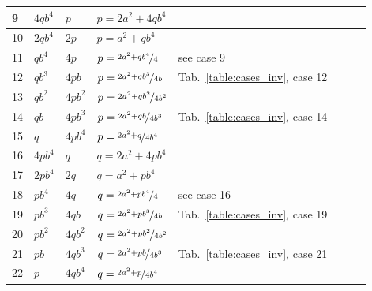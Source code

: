 \documentclass[12pt]{amsart}
\theoremstyle{definition}
\begin{document}
{\begin{table}[H]
\begin{tabular}{|l|l|l|l|l|l|l|l|}
				\\
				\hline
				9 &
				$4qb^4$ &
				$p$ &
				$p=2a^2+4qb^4$ &
				&
				&
				&
				
				\\
				\hline
				10 &
				$2qb^4$ &
				$2p$ &
				$p=a^2+qb^4$ &
				&
				&
				&
				
				\\
				\hline
				11 &
				$qb^4$ &
				$4p$ &
				$p=\nicefrac{2a^2+qb^4}{4}$ &
				see case 9&
				&
				&
				
				\\
				\hline
				12 &
				$qb^3$ &
				$4pb$ &
				$p=\nicefrac{2a^2+qb^3}{4b}$ &
				Tab.~\ref{table:cases_inv}, case 12 &
				&
				&
				
				\\
				\hline
				13 &
				$qb^2$ &
				$4pb^2$ &
				$p=\nicefrac{2a^2+qb^2}{4b^2}$ &
				&
				&
				&
				
				\\
				\hline
				14 &
				$qb$ &
				$4pb^3$ &
				$p=\nicefrac{2a^2+qb}{4b^3}$ &
				Tab.~\ref{table:cases_inv}, case 14 &
				&
				&
				
				\\
				\hline
				15 &
				$q$ &
				$4pb^4$ &
				$p=\nicefrac{2a^2+q}{4b^4}$ &
				&
				&
				&
				
				\\
				\hline
				16 &
				$4pb^4$ &
				$q$ &
				$q=2a^2+4pb^4$ &
				&
				&
				&
				
				\\
				\hline
				17 &
				$2pb^4$ &
				$2q$ &
				$q=a^2+pb^4$ &
				&
				&
				&
				
				\\
				\hline
				18 &
				$pb^4$ &
				$4q$ &
				$q=\nicefrac{2a^2+pb^4}{4}$ &
				see case 16 &
				&
				&
				
				\\
				\hline
				19 &
				$pb^3$ &
				$4qb$ &
				$q=\nicefrac{2a^2+pb^3}{4b}$ &
				Tab.~\ref{table:cases_inv}, case 19 &
				&
				&
				
				\\
				\hline
				20 &
				$pb^2$ &
				$4qb^2$ &
				$q=\nicefrac{2a^2+pb^2}{4b^2}$ &
				&
				&
				&
				
				\\
				\hline
				21 &
				$pb$ &
				$4qb^3$ &
				$q=\nicefrac{2a^2+pb}{4b^3}$ &
				Tab.~\ref{table:cases_inv}, case 21 &
				&
				&
				
				\\
				\hline
				22 &
				$p$ &
				$4qb^4$ &
				$q=\nicefrac{2a^2+p}{4b^4}$ &
				&
				&
				&
				

\end{tabular}
\end{table}}
\end{document}
